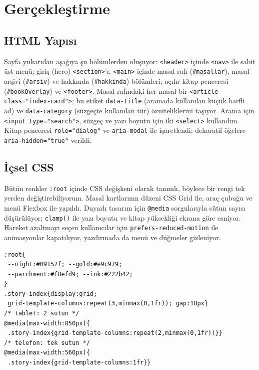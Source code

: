 \documentclass[12pt,a4paper]{article}
\begin{document}
\section{Gerçekleştirme}
\subsection{HTML Yapısı}
Sayfa yukarıdan aşağıya şu bölümlerden oluşuyor: \texttt{<header>} içinde \texttt{<nav>} ile
sabit üst menü; giriş (hero) \texttt{<section>}'ı; \texttt{<main>} içinde masal rafı
(\texttt{\#masallar}), masal arşivi (\texttt{\#arsiv}) ve hakkında (\texttt{\#hakkinda})
bölümleri; açılır kitap penceresi (\texttt{\#bookOverlay}) ve \texttt{<footer>}. Masal rafındaki
her masal bir \texttt{<article class="index-card">}; bu etiket \texttt{data-title} (aramada
kullanılan küçük harfli ad) ve \texttt{data-category} (süzgeçte kullanılan tür) özniteliklerini
taşıyor. Arama için \texttt{<input type="search">}, süzgeç ve yazı boyutu için iki
\texttt{<select>} kullandım. Kitap penceresi \texttt{role="dialog"} ve \texttt{aria-modal}
ile işaretlendi; dekoratif öğelere \texttt{aria-hidden="true"} verildi.

\subsection{İçsel CSS}
Bütün renkler \texttt{:root} içinde CSS değişkeni olarak tanımlı, böylece bir rengi tek
yerden değiştirebiliyorum. Masal kartlarının düzeni CSS Grid ile, araç çubuğu ve menü
Flexbox ile yapıldı. Duyarlı tasarım için \texttt{@media} sorgularıyla sütun sayısı
düşürülüyor; \texttt{clamp()} ile yazı boyutu ve kitap yüksekliği ekrana göre esniyor.
Hareket azaltmayı seçen kullanıcılar için \texttt{prefers-reduced-motion} ile animasyonlar
kapatılıyor, yazdırmada da menü ve düğmeler gizleniyor.

\begin{lstlisting}[caption={İçsel CSS'ten önemli bir bölüm}]
:root{
 --night:#09152f; --gold:#e9c979;
 --parchment:#f8efd9; --ink:#222b42;
}
.story-index{display:grid;
 grid-template-columns:repeat(3,minmax(0,1fr)); gap:18px}
/* tablet: 2 sutun */
@media(max-width:850px){
 .story-index{grid-template-columns:repeat(2,minmax(0,1fr))}}
/* telefon: tek sutun */
@media(max-width:560px){
 .story-index{grid-template-columns:1fr}}
\end{lstlisting}
\end{document}
